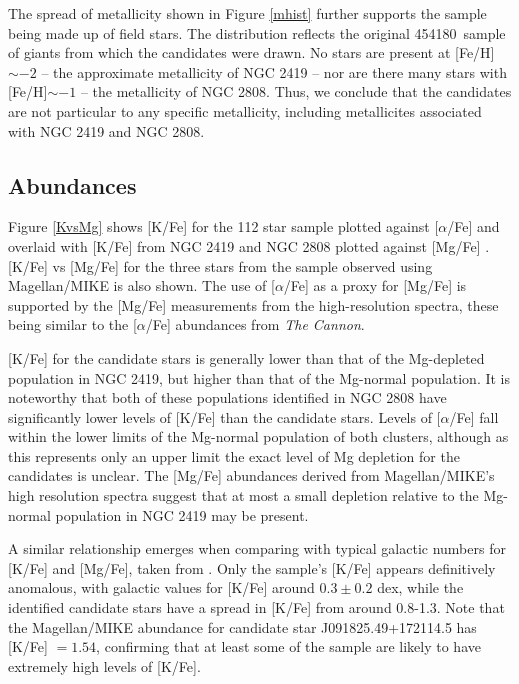 \documentclass[a4paper,fleqn,usenatbib]{mnras}
\newcommand{\LamostGiants}{454180}
\newcommand{\project}[1]{\emph{#1}}
\newcommand{\tc}{\project{The Cannon}}
\begin{document}
The spread of metallicity shown in Figure \ref{mhist} further supports the sample being made up of field stars. The distribution reflects the original \LamostGiants \ sample of giants from which the candidates were drawn.
No stars are present at [Fe/H]$\sim -2$ -- the approximate metallicity of NGC 2419 -- nor are there many stars with [Fe/H]$\sim -1$ -- the metallicity of NGC 2808. Thus, we conclude that the candidates are not particular to any specific metallicity, including metallicites associated with NGC 2419 and NGC 2808.


\subsection{Abundances}
\label{sec:abundances}
Figure \ref{KvsMg} shows [K/Fe]  for the 112 star sample plotted against $[\alpha$/Fe] and overlaid with [K/Fe] from NGC 2419 and NGC 2808 plotted against [Mg/Fe] \citep{cohenkirby2012, mucciarelli2012, mucciarelli2015}. [K/Fe] vs [Mg/Fe] for the three stars from the sample observed using Magellan/MIKE is also shown. The use of [$\alpha$/Fe] as a proxy for [Mg/Fe] is supported by the [Mg/Fe] measurements from the high-resolution spectra, these being similar to the [$\alpha$/Fe] abundances from \tc.

[K/Fe] for the candidate stars is generally lower than that of the Mg-depleted population in NGC 2419, but higher than that of the Mg-normal population. It is noteworthy that both of these populations identified in NGC 2808 have significantly lower levels of [K/Fe] than the candidate stars.
Levels of [$\alpha$/Fe] fall within the lower limits of the Mg-normal population of both clusters, although as this represents only an upper limit the exact level of Mg depletion for the candidates is unclear. The [Mg/Fe] abundances derived from Magellan/MIKE's high resolution spectra suggest that at most a small depletion relative to the Mg-normal population in NGC 2419 may be present.

A similar relationship emerges when comparing with typical galactic numbers for [K/Fe] and [Mg/Fe], taken from \cite{kobayashi2011}.
Only the sample's [K/Fe] appears definitively anomalous, with galactic values for [K/Fe] around $0.3 \pm 0.2$ dex, while the identified candidate stars have a spread in [K/Fe] from around 0.8-1.3. Note that the Magellan/MIKE abundance for candidate star J091825.49+172114.5 has [K/Fe] $=1.54$, confirming that at least some of the sample are likely to have extremely high levels of [K/Fe].
\end{document}
